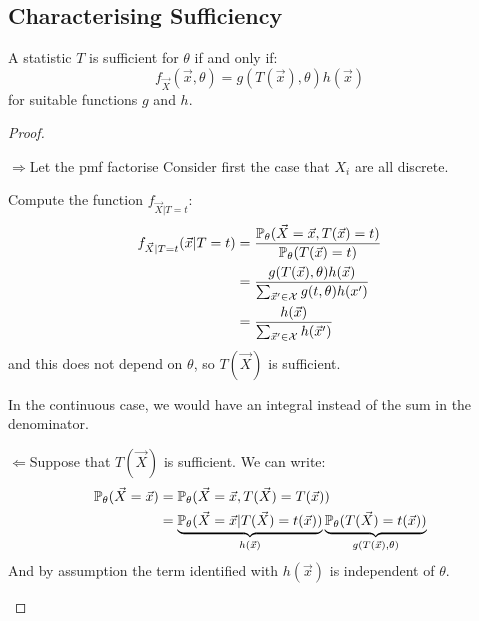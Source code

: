 \documentclass[../Main.tex]{subfiles}
\begin{document}
\subsection{Characterising Sufficiency}
\begin{theorem}
    A statistic $T$ is sufficient for $\theta$ if and only if:
    \begin{equation*}
        f_{\vec{X}}(\vec{x}, \theta) = g(T(\vec{x}), \theta)h(\vec{x})
    \end{equation*}
    for suitable functions $g$ and $h$.
    \label{thmFactorisationCriterion}
\end{theorem}
\begin{proof}
    \begin{proofdirection}{$\Rightarrow$}{Let the pmf factorise}
        Consider first the case that $X_i$ are all discrete.

        Compute the function $f_{\vec{X} | T = t}$:
        \begin{align*}
            f_{\vec{X}|T = t}(\vec{x} | T = t) &= \frac{\P_\theta(\vec{X} = \vec{x}, T(\vec{x}) = t)}{\P_\theta(T(\vec{x}) = t)} \\
            &= \frac{g(T(\vec{x}), \theta) h(\vec{x})}{\sum_{\vec{x}' \in \samplespace} g(t, \theta)h(x')} \\
            &= \frac{h(\vec{x})}{\sum_{\vec{x}' \in \samplespace} h(\vec{x}')} \\
        \end{align*}
        and this does not depend on $\theta$, so $T(\vec{X})$ is sufficient.

        In the continuous case, we would have an integral instead of the sum in the denominator.
    \end{proofdirection}
    \begin{proofdirection}{$\Leftarrow$}{Suppose that $T(\vec{X})$ is sufficient.}
        We can write:
        \begin{align*}
            \P_\theta(\vec{X} = \vec{x}) &= \P_\theta(\vec{X} = \vec{x}, T(\vec{X}) = T(\vec{x})) \\
            &= \underbrace{\P_\theta(\vec{X} = \vec{x} | T(\vec{X}) = t(\vec{x}))}_{h(\vec{x})} \underbrace{\P_\theta(T(\vec{X}) = t(\vec{x}))}_{g(T(\vec{x}), \theta)}
        \end{align*}
        And by assumption the term identified with $h(\vec{x})$ is independent of $\theta$.
    \end{proofdirection}
\end{proof}
\end{document}
